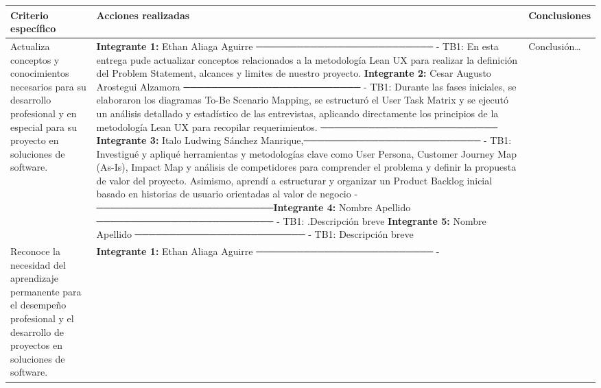 {\def\LTcaptype{none} %
\begin{longtable}[]{@{}
  >{\raggedright\arraybackslash}p{}
  >{\raggedright\arraybackslash}p{}
  >{\raggedright\arraybackslash}p{}@{}}
\toprule\noalign{}
\begin{minipage}[b]{\linewidth}\raggedright
Criterio específico
\end{minipage} & \begin{minipage}[b]{\linewidth}\raggedright
Acciones realizadas
\end{minipage} & \begin{minipage}[b]{\linewidth}\raggedright
Conclusiones
\end{minipage} \\
\midrule\noalign{}
\endhead
\bottomrule\noalign{}
\endlastfoot
Actualiza conceptos y conocimientos necesarios para su desarrollo
profesional y en especial para su proyecto en soluciones de software. &
\textbf{Integrante 1:} Ethan Aliaga Aguirre ────────────────────────── -
TB1: En esta entrega pude actualizar conceptos relacionados a la
metodología Lean UX para realizar la definición del Problem Statement,
alcances y limites de nuestro proyecto. \textbf{Integrante 2:} Cesar
Augusto Arostegui Alzamora ────────────────────────── - TB1: Durante las
fases iniciales, se elaboraron los diagramas To-Be Scenario Mapping, se
estructuró el User Task Matrix y se ejecutó un análisis detallado y
estadístico de las entrevistas, aplicando directamente los principios de
la metodología Lean UX para recopilar requerimientos.
────────────────────────── \textbf{Integrante 3:} Italo Ludwing Sánchez
Manrique,────────────────────────── - TB1: Investigué y apliqué
herramientas y metodologías clave como User Persona, Customer Journey
Map (As-Is), Impact Map y análisis de competidores para comprender el
problema y definir la propuesta de valor del proyecto. Asimismo, aprendí
a estructurar y organizar un Product Backlog inicial basado en historias
de usuario orientadas al valor de negocio -
──────────────────────────\textbf{Integrante 4:} Nombre Apellido
────────────────────────── - TB1: .Descripción breve \textbf{Integrante
5:} Nombre Apellido ───────────────────────── - TB1: Descripción breve &
Conclusión\ldots{} \\
Reconoce la necesidad del aprendizaje permanente para el desempeño
profesional y el desarrollo de proyectos en soluciones de software. &
\textbf{Integrante 1:} Ethan Aliaga Aguirre ────────────────────────── -

\end{longtable}}
